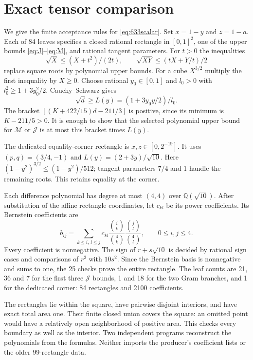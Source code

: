 \documentclass[11pt]{article}
\begin{document}
\section{Exact tensor comparison}\label{app:tensor}
We give the finite acceptance rules for \eqref{eq:633scalar}.
Set $x=1-y$ and $z=1-a$. Each of 84 leaves specifies a closed rational
rectangle in $[0,1]^2$, one of the upper bounds \eqref{eq:J}--\eqref{eq:M},
and rational tangent parameters. For $t>0$ the inequalities
\[
 \sqrt X\le(X+t^2)/(2t),\qquad
 \sqrt{XY}\le(tX+Y/t)/2
\]
replace square roots by polynomial upper bounds. For a cube $X^{3/2}$
multiply the first inequality by $X\ge0$.
Choose rational $y_0\in[0,1]$ and $l_0>0$ with
$l_0^2\ge1+3y_0^2/2$. Cauchy--Schwarz gives
\[
 \sqrt d\ge L(y)=(1+3y_0y/2)/l_0.
\]
The bracket $[(K+422/15)d-211/3]$ is positive, since its minimum
is $K-211/5>0$. It is enough to show that the selected polynomial upper
bound for $\mathcal M$ or $\mathcal J$ is at most this bracket times
$L(y)$.

The dedicated equality-corner rectangle is
$x,z\in[0,2^{-19}]$. It uses $(p,q)=(3/4,-1)$ and
$L(y)=(2+3y)/\sqrt{10}$. Here
$(1-y^2)^{3/2}\le(1-y^2)/512$; tangent parameters $7/4$ and $1$
handle the remaining roots. This retains equality at the corner.

Each difference polynomial has degree at most $(4,4)$ over
$\mathbb Q(\sqrt{10})$. After substitution of the affine rectangle
coordinates, let $c_{kl}$ be its power coefficients. Its Bernstein
coefficients are
\[
 b_{ij}=\sum_{k\le i,\,l\le j}c_{kl}
 \frac{\binom ik}{\binom4k}\frac{\binom jl}{\binom4l},
 \qquad 0\le i,j\le4.
\]
Every coefficient is nonnegative. The sign of $r+s\sqrt{10}$ is
decided by rational sign cases and comparisons of $r^2$ with $10s^2$.
Since the Bernstein basis is nonnegative and sums to one, the 25 checks
prove the entire rectangle. The leaf counts are 21, 36 and 7 for the
first three $\mathcal J$ bounds, 1 and 18 for the two Gram branches,
and 1 for the dedicated corner: 84 rectangles and 2100 coefficients.

The rectangles lie within the square, have pairwise disjoint interiors,
and have exact total area one. Their finite closed union covers the square:
an omitted point would have a relatively open neighborhood of positive
area. This checks every boundary as well as the interior. Two independent
programs reconstruct the polynomials from the formulas. Neither imports
the producer's coefficient lists or the older 99-rectangle data.
\end{document}
